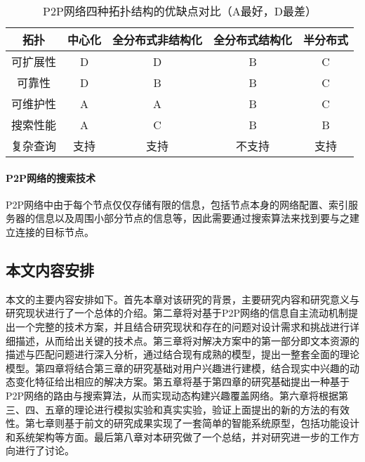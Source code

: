 \begin{table}
\caption{P2P网络四种拓扑结构的优缺点对比（A最好，D最差）}
\centering
\begin{tabular}{|c|c|c|c|c|} 
\hline
拓扑 & 中心化 & 全分布式非结构化 & 全分布式结构化 & 半分布式 \\
\hline
可扩展性 & D & D & B & C \\
\hline
可靠性 & D & B & B & C \\
\hline
可维护性 & A & A & B & C \\
\hline
搜索性能 & A & C & B & B \\
\hline
复杂查询 & 支持 & 支持 & 不支持 & 支持 \\
\hline
\end{tabular}
\label{tbl:topologycomp}
\end{table}

\paragraph{P2P网络的搜索技术}
P2P网络中由于每个节点仅仅存储有限的信息，包括节点本身的网络配置、索引服务器的信息以及周围小部分节点的信息等，因此需要通过搜索算法来找到要与之建立连接的目标节点。

\subsection{本文内容安排}
本文的主要内容安排如下。首先本章对该研究的背景，主要研究内容和研究意义与研究现状进行了一个总体的介绍。第二章将对基于P2P网络的信息自主流动机制提出一个完整的技术方案，并且结合研究现状和存在的问题对设计需求和挑战进行详细描述，从而给出关键的技术点。第三章将对解决方案中的第一部分即文本资源的描述与匹配问题进行深入分析，通过结合现有成熟的模型，提出一整套全面的理论模型。第四章将结合第三章的研究基础对用户兴趣进行建模，结合现实中兴趣的动态变化特征给出相应的解决方案。第五章将基于第四章的研究基础提出一种基于P2P网络的路由与搜索算法，从而实现动态构建兴趣覆盖网络。第六章将根据第三、四、五章的理论进行模拟实验和真实实验，验证上面提出的新的方法的有效性。第七章则基于前文的研究成果实现了一套简单的智能系统原型，包括功能设计和系统架构等方面。最后第八章对本研究做了一个总结，并对研究进一步的工作方向进行了讨论。

